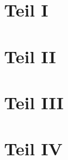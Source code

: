 \documentclass[handout]{beamer}
\begin{document}
	\part{Teil I}
	\part{Teil II}
	
	\part{Teil III}
	
	\part{Teil IV}
	
\end{document}
